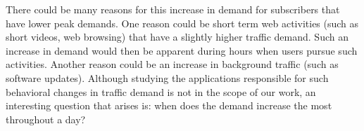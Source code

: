 There could be many reasons for this increase in demand for subscribers that
have lower peak demands. One reason could be short term web activities (such as short videos,
web browsing) that have a slightly higher traffic demand. Such an increase in demand would then
be apparent during hours when users pursue such activities. Another reason could be
an increase in background traffic (such as software updates). Although studying the applications 
responsible for such behavioral changes in traffic demand is not in the scope of our
work, an interesting question that arises is: when does the demand increase the most 
throughout a day?